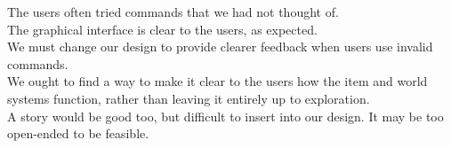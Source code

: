 \documentclass{article}
\begin{document}
The users often tried commands that we had not thought of.\\

The graphical interface is clear to the users, as expected.\\

We must change our design to provide clearer feedback when users use invalid
commands.\\

We ought to find a way to make it clear to the users how the item and world
systems function, rather than leaving it entirely up to exploration.\\

A story would be good too, but difficult to insert into our design. It may be
too open-ended to be feasible.\\
\end{document}
